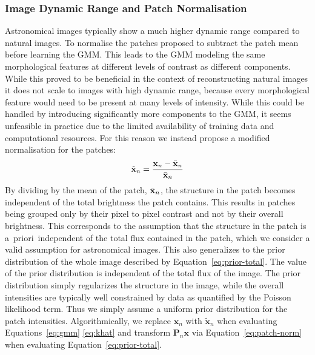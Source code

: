 \documentclass[twocolumn]{aastex631}
\newcommand{\aprioir}{a~priori~}
\begin{document}
    \subsubsection{Image Dynamic Range and Patch Normalisation}
    \label{ssec:patch-norm}
    Astronomical images typically show a much higher dynamic range compared to natural images.
    To normalise the patches \cite{Zoran2011} proposed to subtract the patch mean before learning the GMM. This leads to the GMM modeling the same morphological features at different levels of contrast as different components. While this proved to be beneficial in the context of reconstructing natural images it does not scale to images with high dynamic range, because every morphological feature would need to be present at many levels of intensity. While this could be handled by introducing significantly more components to the GMM, it seems unfeasible in practice due to the limited availability of training data and computational resources. For this reason we instead propose a modified normalisation for the patches:
    \begin{equation}
        \label{eq:patch-norm}
        \tilde{\mathbf{x}}_n = \frac{\mathbf{x}_n - \Bar{\mathbf{x}}_n}{\Bar{\mathbf{x}}_n}
    \end{equation}
    By dividing by the mean of the patch, $\Bar{\mathbf{x}}_n$, the structure in the patch becomes independent of the total brightness the patch contains. This results in patches being grouped only by their pixel to pixel contrast and not by their overall brightness. This corresponds to the assumption that the structure in the patch is \aprioir independent of the total flux contained in the patch, which we consider a valid assumption for astronomical images. This also generalizes to the prior distribution of the whole image described by Equation~\ref{eq:prior-total}. The value of the prior distribution is independent of the total flux of the image. The prior distribution simply regularizes the structure in the image, while the overall intensities are typically well constrained by data as quantified by the Poisson likelihood term. Thus we simply assume a uniform prior distribution for the patch intensities. Algorithmically, we replace $\mathbf{x}_n$ with $\tilde{\mathbf{x}}_n$ when evaluating Equations~\ref{eq:gmm} \ref{eq:khat} and transform $\mathbf{P}_n\mathbf{x}$ via Equation~\ref{eq:patch-norm} when evaluating Equation~\ref{eq:prior-total}.
\end{document}
